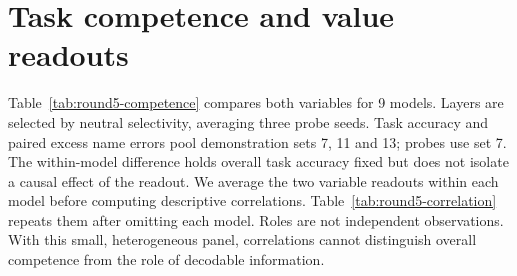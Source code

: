 \newsavebox{\roundfivebox}
\section{Task competence and value readouts}
\label{app:round5-competence}
Table~\ref{tab:round5-competence} compares both variables for 9 models. Layers are selected by neutral selectivity, averaging three probe seeds. Task accuracy and paired excess name errors pool demonstration sets 7, 11 and 13; probes use set 7. The within-model difference holds overall task accuracy fixed but does not isolate a causal effect of the readout.
We average the two variable readouts within each model before computing descriptive correlations. Table~\ref{tab:round5-correlation} repeats them after omitting each model. Roles are not independent observations. With this small, heterogeneous panel, correlations cannot distinguish overall competence from the role of decodable information.
